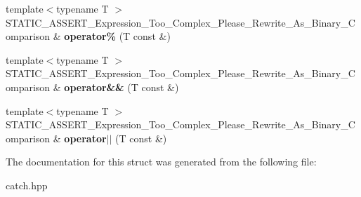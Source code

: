 \begin{DoxyCompactItemize}
\item 
\mbox{\label{structCatch_1_1DecomposedExpression_a6584335aadaee847c9d06ca8f13a4477}} 
{\footnotesize template$<$typename T $>$ }\\S\+T\+A\+T\+I\+C\+\_\+\+A\+S\+S\+E\+R\+T\+\_\+\+Expression\+\_\+\+Too\+\_\+\+Complex\+\_\+\+Please\+\_\+\+Rewrite\+\_\+\+As\+\_\+\+Binary\+\_\+\+Comparison \& {\bfseries operator\%} (T const \&)
\item 
\mbox{\label{structCatch_1_1DecomposedExpression_a14d913535796145b39101a16c0c490da}} 
{\footnotesize template$<$typename T $>$ }\\S\+T\+A\+T\+I\+C\+\_\+\+A\+S\+S\+E\+R\+T\+\_\+\+Expression\+\_\+\+Too\+\_\+\+Complex\+\_\+\+Please\+\_\+\+Rewrite\+\_\+\+As\+\_\+\+Binary\+\_\+\+Comparison \& {\bfseries operator\&\&} (T const \&)
\item 
\mbox{\label{structCatch_1_1DecomposedExpression_ab4800d277290088fea9c594cfdd4f1c7}} 
{\footnotesize template$<$typename T $>$ }\\S\+T\+A\+T\+I\+C\+\_\+\+A\+S\+S\+E\+R\+T\+\_\+\+Expression\+\_\+\+Too\+\_\+\+Complex\+\_\+\+Please\+\_\+\+Rewrite\+\_\+\+As\+\_\+\+Binary\+\_\+\+Comparison \& {\bfseries operator$\vert$$\vert$} (T const \&)
\end{DoxyCompactItemize}


The documentation for this struct was generated from the following file\+:\begin{DoxyCompactItemize}
\item 
catch.\+hpp\end{DoxyCompactItemize}
